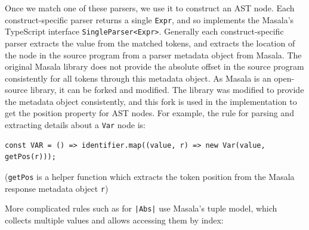 \documentclass[a4paper,fleqn,oneside,12pt]{report}
\begin{document}
Once we match one of these parsers, we use it to construct an AST node. Each construct-specific parser returns a single \texttt{Expr}, and so implements the Masala's TypeScript interface \texttt{SingleParser<Expr>}. Generally each construct-specific parser extracts the value from the matched tokens, and extracts the location of the node in the source program from a parser metadata object from Masala. The original Masala library does not provide the absolute offset in the source program consistently for all tokens through this metadata object. As Masala is an open-source library, it can be forked and modified. The library was modified to provide the metadata object consistently, and this fork is used in the implementation to get the position property for AST nodes. For example, the rule for parsing and extracting details about a \texttt{Var} node is:

\begin{verbatim}
const VAR = () => identifier.map((value, r) => new Var(value, getPos(r)));
\end{verbatim}
(\texttt{getPos} is a helper function which extracts the token position from the Masala response metadata object \texttt{r})

More complicated rules such as for \texttt{|Abs|} use Masala’s tuple model, which collects multiple values and allows accessing them by index:
\end{document}
